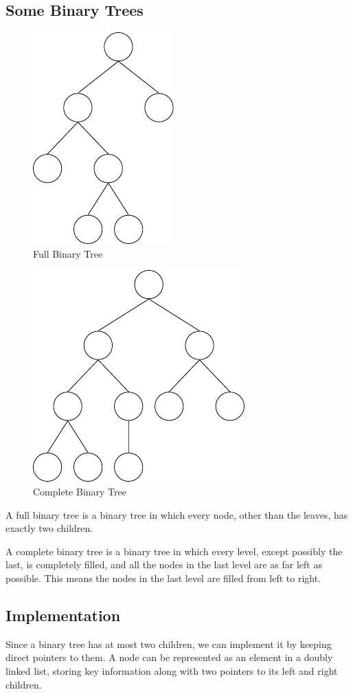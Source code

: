 \subsection{Some Binary Trees}
\begin{minipage}{0.5\textwidth}
  \begin{figure}[H]
    \centering
    \includegraphics[height=0.3\textwidth]{Figure/FBT.pdf}
    \caption{Full Binary Tree}
  \end{figure}
\end{minipage}
\begin{minipage}{0.5\textwidth}
  \begin{figure}[H]
    \centering
    \includegraphics[height=0.3\textwidth]{Figure/CBT.pdf}
    \caption{Complete Binary Tree}
  \end{figure}
\end{minipage}

A full binary tree is a binary tree in which every node, other than the leaves, has exactly two children.

A complete binary tree is a binary tree in which every level, except possibly the last, is completely filled, and all the nodes in the last level are as far left as possible. This means the nodes in the last level are filled from left to right.

\subsection{Implementation}
Since a binary tree has at most two children, we can implement it by keeping direct pointers to them. A node can be represented as an element in a doubly linked list, storing key information along with two pointers to its left and right children. 

